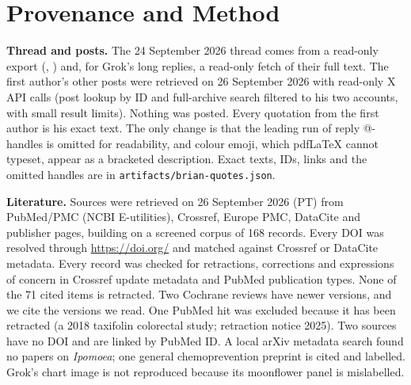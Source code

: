 \documentclass[11pt,a4paper]{article}
\begin{document}
\section*{Provenance and Method}
\textbf{Thread and posts.} The 24 September 2026 thread comes from a read-only export (, ) and, for Grok's long replies, a read-only fetch of their full text. The first author's other posts were retrieved on 26 September 2026 with read-only X API calls (post lookup by ID and full-archive search filtered to his two accounts, with small result limits). Nothing was posted. Every quotation from the first author is his exact text. The only change is that the leading run of reply @-handles is omitted for readability, and colour emoji, which pdf\LaTeX{} cannot typeset, appear as a bracketed description. Exact texts, IDs, links and the omitted handles are in \texttt{artifacts/brian-quotes.json}.

\textbf{Literature.} Sources were retrieved on 26 September 2026 (PT) from PubMed/PMC (NCBI E-utilities), Crossref, Europe PMC, DataCite and publisher pages, building on a screened corpus of 168 records. Every DOI was resolved through \url{https://doi.org/} and matched against Crossref or DataCite metadata. Every record was checked for retractions, corrections and expressions of concern in Crossref update metadata and PubMed publication types. None of the 71 cited items is retracted. Two Cochrane reviews have newer versions, and we cite the versions we read. One PubMed hit was excluded because it has been retracted (a 2018 taxifolin colorectal study; retraction notice 2025). Two sources have no DOI and are linked by PubMed ID. A local arXiv metadata search found no papers on \emph{Ipomoea}; one general chemoprevention preprint is cited and labelled. Grok's chart image is not reproduced because its moonflower panel is mislabelled.



\end{document}
